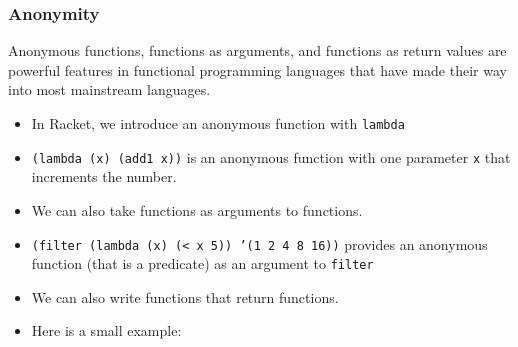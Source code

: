 \documentclass{beamer}
\begin{document}



\begin{frame}
  \frametitle{Anonymity}
  Anonymous functions, functions as arguments, and functions as return values
  are powerful features in functional programming languages that have made
  their way into most mainstream languages.
  \begin{itemize}
  \item<2-> In Racket, we introduce an anonymous function with
    \texttt{lambda}
  \item<3-> \texttt{(lambda (x) (add1 x))} is an anonymous function
    with one parameter \texttt{x} that increments the number.
  \item<4-> We can also take functions as arguments to functions.
  \item<5-> \texttt{(filter (lambda (x) (< x 5)) '(1 2 4 8 16))}
    provides an anonymous function (that is a predicate) as an argument to
    \texttt{filter}
  \item<6-> We can also write functions that return functions.
  \item<7-> Here is a small example:
    \CurryAdd
  \end{itemize}
\end{frame}

\end{document}
